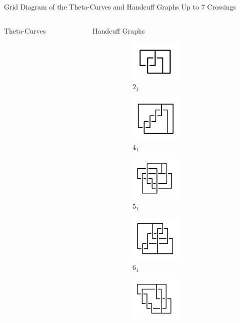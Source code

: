 \documentclass[final]{beamer}
\begin{document}
\begin{frame}[t]
\begin{alertblock}{Grid Diagram of the Theta-Curves and Handcuff Graphs Up to 7 Crossings}
\begin{columns}[t]
\begin{column}{0.7\textwidth}
\begin{alertblock}{Theta-Curves}
  \end{alertblock}
\end{column}
\begin{column}{0.3\textwidth}
  \begin{alertblock}{Handcuff Graphs}
  \begin{figure}
    \begin{subfigure}{0.15\textwidth}
    \includegraphics[width=2.5cm]{../Midterm_Poster/grid_diagram/handcuff_2_1.png}
    \caption{$2_{1}$} 
    \end{subfigure}
    \begin{subfigure}{0.15\textwidth}
    \includegraphics[width=2.5cm]{../Midterm_Poster/grid_diagram/handcuff_4_1.png}
    \caption{$4_{1}$} 
    \end{subfigure}
    \begin{subfigure}{0.15\textwidth}
    \includegraphics[width=2.5cm]{../Midterm_Poster/grid_diagram/handcuff_5_1.png}
    \caption{$5_{1}$} 
    \end{subfigure}
    \begin{subfigure}{0.15\textwidth}
    \includegraphics[width=2.5cm]{../Midterm_Poster/grid_diagram/handcuff_6_1.png}
    \caption{$6_{1}$} 
    \end{subfigure}
    \begin{subfigure}{0.15\textwidth}
    \includegraphics[width=2.5cm]{../Midterm_Poster/grid_diagram/handcuff_6_2.png}

\end{subfigure}
\end{figure}
\end{alertblock}
\end{column}
\end{columns}
\end{alertblock}
\end{frame}
\end{document}
